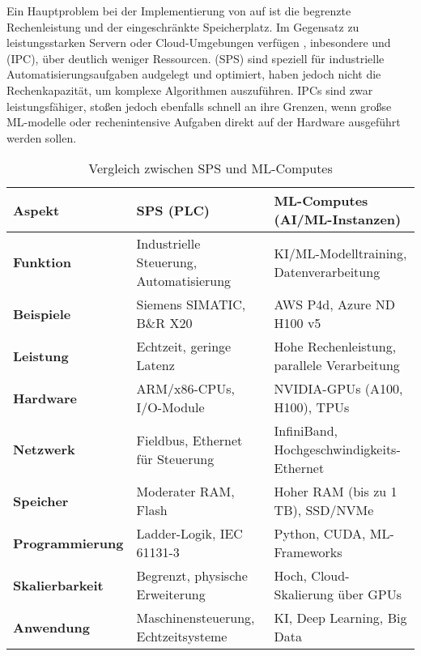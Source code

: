 Ein Hauptproblem bei der Implementierung von \ML auf \Emb ist die begrenzte Rechenleistung und der eingeschränkte Speicherplatz.
Im Gegensatz zu leistungsstarken Servern oder Cloud-Umgebungen verfügen \Emb, inbesondere \SPS und \IPC (IPC), über deutlich weniger 
Ressourcen. \SPS (SPS) sind speziell für industrielle Automatisierungsaufgaben audgelegt und optimiert, haben jedoch nicht die 
Rechenkapazität, um komplexe \ML Algorithmen auszuführen. IPCs sind zwar leistungsfähiger, stoßen jedoch ebenfalls schnell an ihre 
Grenzen, wenn großse ML-modelle oder rechenintensive Aufgaben direkt auf der Hardware ausgeführt werden sollen.
\begin{table}[h!]
    \centering
    \begin{tabular}{|l|l|l|}
    \hline
    \textbf{Aspekt}        & \textbf{SPS (PLC)}                            & \textbf{ML-Computes (AI/ML-Instanzen)}         \\ \hline
    \textbf{Funktion}      & Industrielle Steuerung, Automatisierung       & KI/ML-Modelltraining, Datenverarbeitung        \\ \hline
    \textbf{Beispiele}     & Siemens SIMATIC, B\&R X20                     & AWS P4d, Azure ND H100 v5                      \\ \hline
    \textbf{Leistung}      & Echtzeit, geringe Latenz                      & Hohe Rechenleistung, parallele Verarbeitung    \\ \hline
    \textbf{Hardware}      & ARM/x86-CPUs, I/O-Module                      & NVIDIA-GPUs (A100, H100), TPUs                 \\ \hline
    \textbf{Netzwerk}      & Fieldbus, Ethernet für Steuerung              & InfiniBand, Hochgeschwindigkeits-Ethernet      \\ \hline
    \textbf{Speicher}      & Moderater RAM, Flash                          & Hoher RAM (bis zu 1 TB), SSD/NVMe              \\ \hline
    \textbf{Programmierung} & Ladder-Logik, IEC 61131-3                    & Python, CUDA, ML-Frameworks                    \\ \hline
    \textbf{Skalierbarkeit} & Begrenzt, physische Erweiterung              & Hoch, Cloud-Skalierung über GPUs               \\ \hline
    \textbf{Anwendung}     & Maschinensteuerung, Echtzeitsysteme           & KI, Deep Learning, Big Data                    \\ \hline
    \end{tabular}
    \caption{Vergleich zwischen SPS und ML-Computes}
    \end{table}


